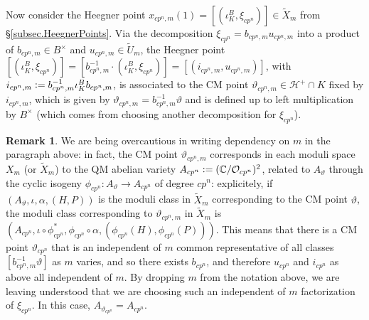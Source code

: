 \documentclass[a4paper]{amsart}
\numberwithin{equation}{section}
\theoremstyle{definition}
\newtheorem{remark}[theorem]{Remark}
\newcommand{\C}{\mathbb{C}}
\newcommand{\defeq}{\vcentcolon=}
\begin{document}
Now consider the Heegner point $x_{cp^n,m}(1)=[(\iota_K^B,\xi_{cp^n})]\in\widetilde{X}_m$ from \S\ref{subsec.HeegnerPoints}. Via the decomposition $\xi_{cp^n}=b_{cp^n,m}u_{cp^n,m}$ into a product of $b_{cp^n,m}\in B^\times$ and $u_{cp^n,m}\in \widetilde{U}_m$, the Heegner point $[(\iota_K^B,\xi_{cp^n})]=[b_{cp^n,m}^{-1}\cdot(\iota_K^B,\xi_{cp^n})]=[(i_{cp^n,m},u_{cp^n,m})]$, with $i_{cp^n,m}\defeq b_{cp^n,m}^{-1}\iota_K^Bb_{cp^n,m}$, is associated to the CM point $\vartheta_{cp^n,m}\in\mathcal{H}^+\cap K$ fixed by $i_{cp^n,m}$, which is given by $\vartheta_{cp^n,m}=b_{cp^n,m}^{-1}\vartheta$ and is defined up to left multiplication by $B^\times$ (which comes from choosing another decomposition for $\xi_{cp^n}$).
\begin{remark}\label{rem.Factorization}
We are being overcautious in writing dependency on $m$ in the paragraph above: in fact, the CM point $\vartheta_{cp^n,m}$ corresponds in each moduli space $X_m$ (or $\widetilde{X}_m$) to the QM abelian variety $A_{{cp^n}}\defeq (\C/\mathcal{O}_{cp^n})^2$, related to $A_{\vartheta}$ through the cyclic isogeny $\phi_{cp^n}\colon A_{\vartheta}\to A_{{cp^n}}$ of degree $cp^n$: explicitely, if $(A_{\vartheta},\iota,\alpha,(H,P))$ is the moduli class in $\widetilde{X}_m$ corresponding to the CM point $\vartheta$, the moduli class corresponding to $\vartheta_{cp^n,m}$ in $\widetilde{X}_m$ is $(A_{{cp^n}},\iota\circ\phi_{cp^n}^\ast,\phi_{cp^n}\circ\alpha,(\phi_{cp^n}(H),\phi_{cp^n}(P)))$. This means that there is a CM point $\vartheta_{cp^n}$ that is an independent of $m$ common representative of all classes $[b^{-1}_{cp^n,m}\vartheta]$ as $m$ varies, and so there exists $b_{cp^n}$, and therefore $u_{cp^n}$ and $i_{cp^n}$ as above all independent of $m$. By dropping $m$ from the notation above, we are leaving understood that we are choosing such an independent of $m$ factorization of $\xi_{cp^n}$. In this case, $A_{\vartheta_{cp^n}}=A_{cp^n}$.
\end{remark}
\end{document}
